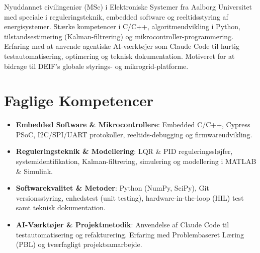\documentclass[11pt,a4paper,sans]{moderncv}
\begin{document}
\makecvtitle


\vspace{6pt}
\small{Nyuddannet civilingeniør (MSc) i Elektroniske Systemer fra Aalborg Universitet med speciale i reguleringsteknik, embedded software og reeltidsstyring af energisystemer. Stærke kompetencer i C/C++, algoritmeudvikling i Python, tilstandsestimering (Kalman-filtrering) og mikrocontroller-programmering. Erfaring med at anvende agentiske AI-værktøjer som Claude Code til hurtig testautomatisering, optimering og teknisk dokumentation. Motiveret for at bidrage til DEIF's globale styrings- og mikrogrid-platforme.}


\section{Faglige Kompetencer}
\vspace{1pt}
\begin{itemize}

\item \textbf{Embedded Software \& Mikrocontrollere}: Embedded C/C++, Cypress PSoC, I2C/SPI/UART protokoller, reeltids-debugging og firmwareudvikling.

\item \textbf{Reguleringsteknik \& Modellering}: LQR \& PID reguleringssløjfer, systemidentifikation, Kalman-filtrering, simulering og modellering i MATLAB \& Simulink.

\item \textbf{Softwarekvalitet \& Metoder}: Python (NumPy, SciPy), Git versionsstyring, enhedstest (unit testing), hardware-in-the-loop (HIL) test samt teknisk dokumentation.

\item \textbf{AI-Værktøjer \& Projektmetodik}: Anvendelse af Claude Code til testautomatisering og refakturering. Erfaring med Problembaseret Læring (PBL) og tværfagligt projektsamarbejde.

\end{itemize}

\end{document}

